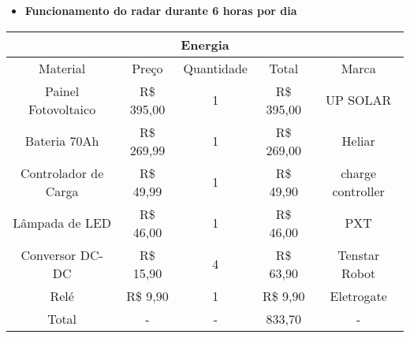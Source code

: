\begin{itemize}
    \item \textbf{Funcionamento do radar durante 6 horas por dia}
\end{itemize}
\begin{table}[H]
\begin{tabular}{|c|c|c|c|c|}
\hline
\multicolumn{5}{|c|}{Energia}                                                 \\ \hline
Material             & Preço         & Quantidade & Total         & Marca     \\ \hline
Painel Fotovoltaico  & R\$ 395,00  & 1          & R\$ 395,00  & UP SOLAR    \\ \hline
Bateria 70Ah              & R\$ 269,99  & 1          & R\$ 269,00  & Heliar  \\ \hline
Controlador de Carga & R\$ 49,99  & 1          & R\$ 49,90  & charge controller \\ \hline
Lâmpada de LED       & R\$ 46,00 & 1          & R\$ 46,00 & PXT         \\ \hline
Conversor DC-DC       & R\$ 15,90 & 4          & R\$ 63,90 & Tenstar Robot         \\ \hline
Relé       & R\$ 9,90 & 1          & R\$ 9,90 & Eletrogate         \\ \hline
Total & - & - & 833,70 & - \\ \hline
\end{tabular}
\end{table}
\vspace*{\fill}
\pagebreak


